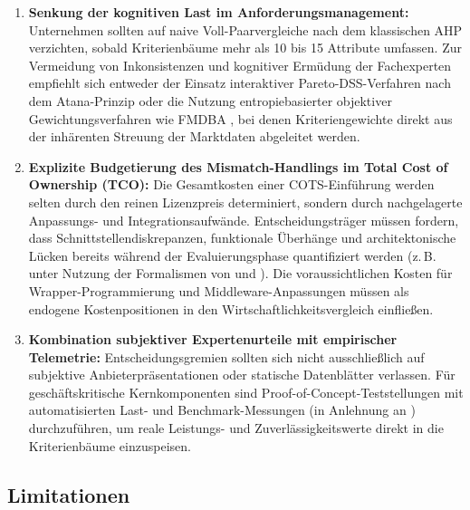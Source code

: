 \begin{enumerate}[label=\textbf{\arabic*.}, leftmargin=*]
  \item \textbf{Senkung der kognitiven Last im Anforderungsmanagement:}  
  Unternehmen sollten auf naive Voll-Paarvergleiche nach dem klassischen AHP verzichten, sobald Kriterienbäume mehr als 10 bis 15 Attribute umfassen. Zur Vermeidung von Inkonsistenzen und kognitiver Ermüdung der Fachexperten empfiehlt sich entweder der Einsatz interaktiver Pareto-DSS-Verfahren nach dem Atana-Prinzip \parencite{MZ8JHDYA} oder die Nutzung entropiebasierter objektiver Gewichtungsverfahren wie FMDBA \parencite{FVINCQ89}, bei denen Kriteriengewichte direkt aus der inhärenten Streuung der Marktdaten abgeleitet werden.
  
  \item \textbf{Explizite Budgetierung des Mismatch-Handlings im Total Cost of Ownership (TCO):}  
  Die Gesamtkosten einer COTS-Einführung werden selten durch den reinen Lizenzpreis determiniert, sondern durch nachgelagerte Anpassungs- und Integrationsaufwände. Entscheidungsträger müssen fordern, dass Schnittstellendiskrepanzen, funktionale Überhänge und architektonische Lücken bereits während der Evaluierungsphase quantifiziert werden (z.\,B. unter Nutzung der Formalismen von \textcite{9F79VAAB} und \textcite{WZM7DUBY}). Die voraussichtlichen Kosten für Wrapper-Programmierung und Middleware-Anpassungen müssen als endogene Kostenpositionen in den Wirtschaftlichkeitsvergleich einfließen.
  
  \item \textbf{Kombination subjektiver Expertenurteile mit empirischer Telemetrie:}  
  Entscheidungsgremien sollten sich nicht ausschließlich auf subjektive Anbieterpräsentationen oder statische Datenblätter verlassen. Für geschäftskritische Kernkomponenten sind Proof-of-Concept-Teststellungen mit automatisierten Last- und Benchmark-Messungen (in Anlehnung an \textcite{8VHUMEKY}) durchzuführen, um reale Leistungs- und Zuverlässigkeitswerte direkt in die Kriterienbäume einzuspeisen.
\end{enumerate}

\subsection{Limitationen}
\label{subsec:limitationen}

